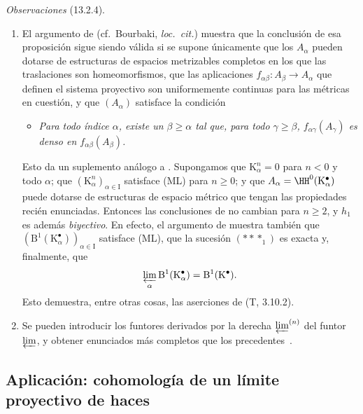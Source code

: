 \documentclass[oneside]{amsart}
\renewcommand{\geq}{\geqslant}
\let\EGAOriginalLabel\label
\renewcommand{\label}[1]{\phantomsection\EGAOriginalLabel{#1}}
\begin{document}
\begin{env}[13.2.4]
\label{0.13.2.4}
\emph{Observaciones} (13.2.4).
\begin{enumerate}
  \item[{\rm(i)}]
  El argumento de 
  (cf.\ Bourbaki, \emph{loc.\ cit.}) muestra que la conclusión de
  esa proposición sigue siendo válida si se supone únicamente que los
  $A_\alpha$ pueden dotarse de estructuras de espacios metrizables completos
  en los que las traslaciones son homeomorfismos, que las aplicaciones
  $f_{\alpha\beta}:A_\beta\longrightarrow A_\alpha$ que definen el
  sistema proyectivo son uniformemente continuas para las métricas en
  cuestión, y que $(A_\alpha)$ satisface la condición
  \begin{itemize}
    \item[(ML$'$)]
    \emph{Para todo índice $\alpha$, existe un $\beta\geq\alpha$ tal
    que, para todo $\gamma\geq\beta$,
    $f_{\alpha\gamma}(A_\gamma)$ es denso en
    $f_{\alpha\beta}(A_\beta)$.}
  \end{itemize}

  Esto da un suplemento análogo a .
  Supongamos que $\mathrm{K}^n_\alpha=0$ para $n<0$ y todo $\alpha$;
  que
  $(\mathrm{K}^n_\alpha)_{\alpha\in\mathrm{I}}$ satisface (ML) para
  $n\geq0$; y que
  $A_\alpha=\HH^0(\mathrm{K}^\bullet_\alpha)$ puede dotarse de
  estructuras de espacio métrico que tengan las propiedades recién enunciadas.
  Entonces las conclusiones de  no cambian para
  $n\geq2$, y $h_1$ es además \emph{biyectivo}.
  En efecto, el argumento de  muestra también que
  $(\mathrm{B}^1(\mathrm{K}^\bullet_\alpha))_{\alpha\in\mathrm{I}}$
  satisface (ML), que la sucesión $(***_1)$ es exacta y, finalmente,
  que
  \[
    \varprojlim_\alpha
    \mathrm{B}^1(\mathrm{K}^\bullet_\alpha)
    =
    \mathrm{B}^1(\mathrm{K}^\bullet).
  \]
  Esto demuestra, entre otras cosas, las aserciones de (T, 3.10.2).

  \item[{\rm(ii)}]
  Se pueden introducir los funtores derivados por la derecha
  $\varprojlim^{(n)}$ del funtor $\varprojlim$, y obtener enunciados más
  completos que los precedentes~\cite{III-28}.
\end{enumerate}
\end{env}

\subsection{Aplicación: cohomología de un límite proyectivo de haces}
\label{subsection:0.13.3}
\end{document}
